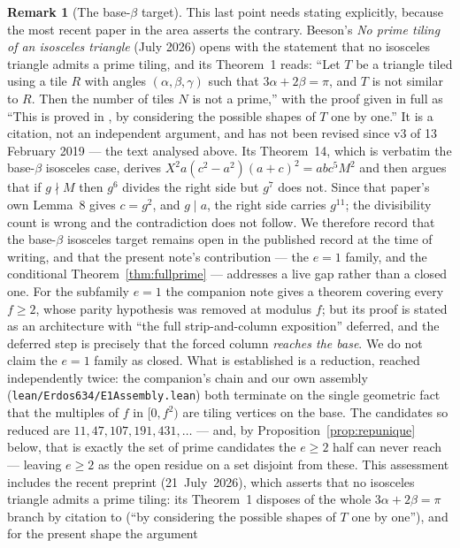 \documentclass[11pt,reqno]{amsart}
\theoremstyle{plain}
\theoremstyle{definition}
\newtheorem{remark}[theorem]{Remark}
\begin{document}
\begin{remark}[The base-$\beta$ target]
This last point needs stating explicitly, because the most recent paper in the area asserts the
contrary. Beeson's \emph{No prime tiling of an isosceles triangle} \cite{BeesonNoPrime} (July 2026)
opens with the statement that no isosceles triangle admits a prime tiling, and its Theorem~1 reads:
``Let $T$ be a triangle tiled using a tile $R$ with angles $(\alpha,\beta,\gamma)$ such that
$3\alpha+2\beta=\pi$, and $T$ is not similar to $R$. Then the number of tiles $N$ is not a prime,''
with the proof given in full as ``This is proved in \cite{BeesonIII}, by considering the possible
shapes of $T$ one by one.'' It is a citation, not an independent argument, and \cite{BeesonIII} has
not been revised since v3 of 13 February 2019 --- the text analysed above. Its Theorem~14, which is
verbatim the base-$\beta$ isosceles case, derives
$X^2a(c^2-a^2)(a+c)^2=abc^5M^2$ and then argues that if $g\nmid M$ then $g^6$ divides the right side
but $g^7$ does not. Since that paper's own Lemma~8 gives $c=g^2$, and $g\mid a$, the right side carries
$g^{11}$; the divisibility count is wrong and the contradiction does not follow. We therefore record
that the base-$\beta$ isosceles target remains open in the published record at the time of writing,
and that the present note's contribution --- the $e=1$ family, and the conditional
Theorem~\ref{thm:fullprime} --- addresses a live gap rather than a closed one. For the subfamily $e=1$ the companion note \cite{Companion}
gives a theorem covering every $f\ge2$, whose parity hypothesis was removed at modulus $f$; but its
proof is stated as an architecture with ``the full strip-and-column exposition'' deferred, and the
deferred step is precisely that the forced column \emph{reaches the base}. We do not claim the
$e=1$ family as closed. What is established is a reduction, reached independently twice: the
companion's chain and our own assembly (\texttt{lean/Erdos634/E1Assembly.lean}) both terminate on
the single geometric fact that the multiples of $f$ in $[0,f^2)$ are tiling vertices on the base.
The candidates so reduced are $11, 47, 107, 191, 431,\dots$ --- and, by
Proposition~\ref{prop:repunique} below, that is exactly the set of prime candidates the $e\ge2$
half can never reach --- leaving $e\ge2$ as the open residue on a set disjoint from these. This assessment includes the recent preprint \cite{BeesonNoPrime}
(21~July~2026), which asserts that no isosceles triangle admits a prime tiling: its Theorem~1
disposes of the whole $3\alpha+2\beta=\pi$ branch by citation to \cite{BeesonIII}
(``by considering the possible shapes of $T$ one by one''), and for the present shape the argument

\end{remark}
\end{document}
